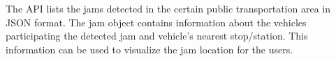The API lists the jams detected in the certain public transportation
area in JSON format. The jam object contains information about the
vehicles participating the detected jam and vehicle’s nearest
stop/station. This information can be used to visualize the jam
location for the users.






